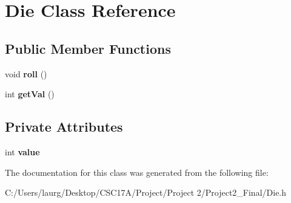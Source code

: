 \hypertarget{class_die}{}\section{Die Class Reference}
\label{class_die}
\subsection*{Public Member Functions}
\begin{DoxyCompactItemize}
\item 
\mbox{\label{class_die_ae4c4a9c129d6ae178f14a14b5f9725d2}} 
void {\bfseries roll} ()
\item 
\mbox{\label{class_die_a658a022e85993828e6a82154b048c3e2}} 
int {\bfseries get\+Val} ()
\end{DoxyCompactItemize}
\subsection*{Private Attributes}
\begin{DoxyCompactItemize}
\item 
\mbox{\label{class_die_a1d3d92c57a6d515d93162af0ca6b3e1d}} 
int {\bfseries value}
\end{DoxyCompactItemize}


The documentation for this class was generated from the following file\+:\begin{DoxyCompactItemize}
\item 
C\+:/\+Users/laurg/\+Desktop/\+C\+S\+C17\+A/\+Project/\+Project 2/\+Project2\+\_\+\+Final/Die.\+h\end{DoxyCompactItemize}
